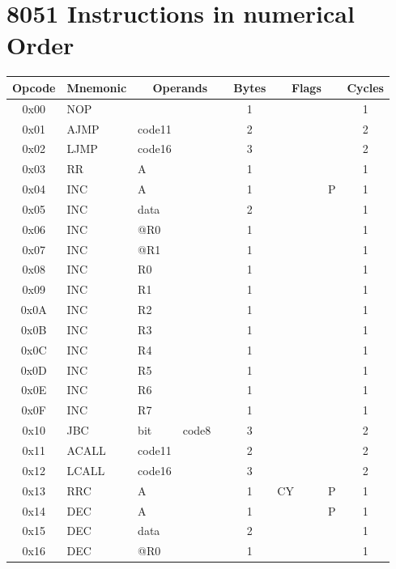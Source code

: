 \documentclass[a4paper,twoside,12pt]{book}
\newcommand{\mysmallfont}{\fontsize{8pt}{10pt} \selectfont{}}
\begin{document}
\chapter{8051 Instructions in numerical Order}
	{
	\mysmallfont{}
	\begin{longtable}{|c|l|lll|c|llll|c|}
		\hline
			\textbf{Opcode} &
			\textbf{Mnemonic} &
			\multicolumn{3}{c|}{\textbf{Operands}} &
			\textbf{Bytes} &
			\multicolumn{4}{c|}{\textbf{Flags}} &
			\textbf{Cycles}	\\\hline
		\endhead

		0x00	& NOP	&	&	&	& 1	&	&	&	&	& 1	\\\hline
		0x01	& AJMP	& code11&	&	& 2	&	&	&	&	& 2	\\\hline
		0x02	& LJMP	& code16&	&	& 3	&	&	&	&	& 2	\\\hline
		0x03	& RR	& A	&	&	& 1	&	&	&	&	& 1	\\\hline
		0x04	& INC	& A	&	&	& 1	&	&	&	& P	& 1	\\\hline
		0x05	& INC	& data	&	&	& 2	&	&	&	&	& 1	\\\hline
		0x06	& INC	& @R0	&	&	& 1	&	&	&	&	& 1	\\\hline
		0x07	& INC	& @R1	&	&	& 1	&	&	&	&	& 1	\\\hline
		0x08	& INC	& R0	&	&	& 1	&	&	&	&	& 1	\\\hline
		0x09	& INC	& R1	&	&	& 1	&	&	&	&	& 1	\\\hline
		0x0A	& INC	& R2	&	&	& 1	&	&	&	&	& 1	\\\hline
		0x0B	& INC	& R3	&	&	& 1	&	&	&	&	& 1	\\\hline
		0x0C	& INC	& R4	&	&	& 1	&	&	&	&	& 1	\\\hline
		0x0D	& INC	& R5	&	&	& 1	&	&	&	&	& 1	\\\hline
		0x0E	& INC	& R6	&	&	& 1	&	&	&	&	& 1	\\\hline
		0x0F	& INC	& R7	&	&	& 1	&	&	&	&	& 1	\\\hline
		0x10	& JBC	& bit	& code8	&	& 3	&	&	&	&	& 2	\\\hline
		0x11	& ACALL	& code11&	&	& 2	&	&	&	&	& 2	\\\hline
		0x12	& LCALL	& code16&	&	& 3	&	&	&	&	& 2	\\\hline
		0x13	& RRC	& A	&	&	& 1	& CY	&	&	& P	& 1	\\\hline
		0x14	& DEC	& A	&	&	& 1	&	&	&	& P	& 1	\\\hline
		0x15	& DEC	& data	&	&	& 2	&	&	&	&	& 1	\\\hline
		0x16	& DEC	& @R0	&	&	& 1	&	&	&	&	& 1	\\\hline

\end{longtable}}
\end{document}
